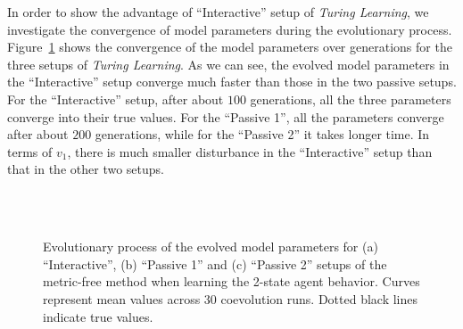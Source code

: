 In order to show the advantage of ``Interactive'' setup of \textit{Turing Learning}, we investigate the convergence of model parameters during the evolutionary process. Figure~\ref{fig:model_parameters_convergence_stochastic_2states} shows the convergence of the model parameters over generations for the three setups of \textit{Turing Learning}. As we can see, the evolved model parameters in the ``Interactive'' setup converge much faster than those in the two passive setups. For the ``Interactive'' setup, after about $100$ generations, all the three parameters converge into their true values. For the ``Passive 1'', all the parameters converge after about $200$ generations, while for the ``Passive 2'' it takes longer time. In terms of $v_1$, there is much smaller disturbance in the ``Interactive'' setup than that in the other two setups. 

\begin{figure}[!t]%
	\centering
		\\
		\\
		\caption{Evolutionary process of the evolved model parameters for (a) ``Interactive'', (b) ``Passive 1'' and (c) ``Passive 2'' setups of the metric-free method when learning the 2-state agent behavior. Curves represent mean values across 30 coevolution runs. Dotted black lines indicate true values.\label{fig:model_parameters_convergence_stochastic_2states}}
\end{figure}

